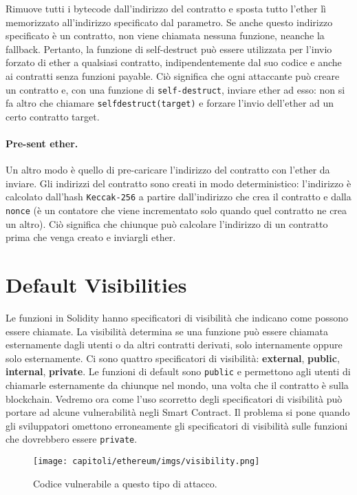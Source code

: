 Rimuove tutti i bytecode dall'indirizzo del contratto e sposta tutto l'ether
lì memorizzato all'indirizzo specificato dal parametro. Se anche questo
indirizzo specificato è un contratto,
non viene chiamata nessuna funzione, neanche la fallback. Pertanto, la funzione di
self-destruct può essere utilizzata per l'invio forzato di ether a qualsiasi
contratto,
indipendentemente dal suo codice e anche ai contratti senza funzioni payable.
Ciò significa che ogni attaccante può creare un contratto e, con una funzione di
\verb|self-destruct|,
inviare ether ad esso: non si fa altro che chiamare \verb|selfdestruct(target)|
e forzare
l'invio dell'ether ad un certo contratto target.

\paragraph{Pre-sent ether.}

Un altro modo è quello di pre-caricare l'indirizzo del contratto con l'ether da
inviare. Gli
indirizzi del contratto sono creati in modo deterministico: l'indirizzo è
calcolato dall'hash \verb|Keccak-256| a partire dall'indirizzo che crea il
contratto e dalla \verb|nonce| (è un
contatore che viene incrementato solo quando quel contratto ne crea un altro).
Ciò significa
che chiunque può calcolare l'indirizzo di un contratto prima che venga creato e
inviargli ether.

\section{Default Visibilities}

Le funzioni in Solidity hanno specificatori di visibilità che indicano come
possono essere chiamate. La visibilità determina se una funzione può essere
chiamata esternamente dagli utenti o da altri contratti derivati, solo internamente
oppure solo esternamente.
Ci sono quattro specificatori di visibilità: \textbf{external}, \textbf{public},
\textbf{internal}, \textbf{private}.
Le funzioni di default sono \verb|public| e permettono agli utenti di chiamarle
esternamente da chiunque nel mondo, una volta che il contratto è sulla blockchain.
Vedremo ora come l'uso scorretto degli specificatori di visibilità può portare
ad alcune vulnerabilità negli Smart Contract.
Il problema si pone quando gli sviluppatori omettono erroneamente gli
specificatori di
visibilità sulle funzioni che dovrebbero essere \verb|private|.

\begin{figure}[H]
      \centering
      \texttt{[image: capitoli/ethereum/imgs/visibility.png]}
      \caption{Codice vulnerabile a questo tipo di attacco.}
\end{figure}


